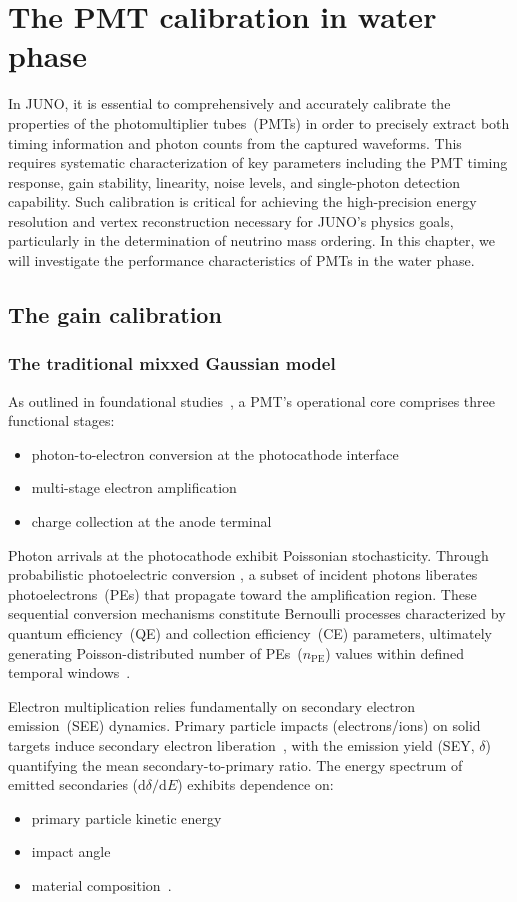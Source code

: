 \chapter{The PMT calibration in water phase}\label{sec:Introduction}
In JUNO, it is essential to comprehensively and accurately calibrate the properties of the photomultiplier tubes~(PMTs) in order to precisely extract both timing information and photon counts from the captured waveforms. This requires systematic characterization of key parameters including the PMT timing response, gain stability, linearity, noise levels, and single-photon detection capability. Such calibration is critical for achieving the high-precision energy resolution and vertex reconstruction necessary for JUNO's physics goals, particularly in the determination of neutrino mass ordering. In this chapter, we will investigate the performance characteristics of PMTs in the water phase.
\section{The gain calibration}
\subsection{The traditional mixxed Gaussian model}
As outlined in foundational studies~\cite{1955Scintillation}, a PMT's operational core comprises three functional stages:
\begin{itemize}
	\item photon-to-electron conversion at the photocathode interface
	\item multi-stage electron amplification
	\item charge collection at the anode terminal
\end{itemize}

Photon arrivals at the photocathode exhibit Poissonian stochasticity. Through probabilistic photoelectric conversion \cite{2016Optimization}, a subset of incident photons liberates photoelectrons~(PEs) that propagate toward the amplification region. These sequential conversion mechanisms constitute Bernoulli processes characterized by quantum efficiency~(QE) and collection efficiency~(CE) parameters, ultimately generating Poisson-distributed number of PEs~($n_{\mathrm{PE}}$) values within defined temporal windows~\cite{1994Absolute}.

Electron multiplication relies fundamentally on secondary electron emission~(SEE) dynamics. Primary particle impacts (electrons/ions) on solid targets induce secondary electron liberation~\cite{2016Secondary}, with the emission yield (SEY, $\delta$) quantifying the mean secondary-to-primary ratio. The energy spectrum of emitted secondaries ($\mathrm{d}\delta/\mathrm{d}E$) exhibits dependence on:
\begin{itemize}
	\item primary particle kinetic energy
	\item impact angle
	\item material composition~\cite{2002Probabilistic}.
\end{itemize}

